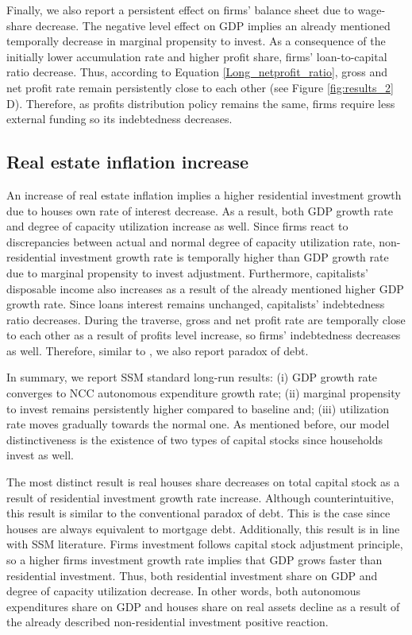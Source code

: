 \documentclass[12pt]{article}
\begin{document}
Finally, we also report a persistent effect on firms' balance sheet due to wage-share decrease.
The negative level effect on GDP implies an already mentioned temporally decrease in marginal propensity to invest.
As a consequence of the initially lower accumulation rate and higher profit share, firms' loan-to-capital ratio decrease.
Thus, according to Equation \ref{Long_netprofit_ratio}, gross and net profit rate remain persistently close to each other (see Figure \ref{fig:results_2} D).
Therefore, as profits distribution policy remains the same, firms require less external funding so its indebtedness decreases.


\subsection{Real estate inflation increase}
\label{sec:org42569ce}
\label{sec:Exp2}


An increase of real estate inflation implies a higher residential investment growth due to houses own rate of interest decrease.
As a result, both GDP growth rate and degree of capacity utilization increase as well.
Since firms react to discrepancies between actual and normal degree of capacity utilization rate, non-residential investment growth rate 
is temporally higher than GDP growth rate due to marginal propensity to invest adjustment.
Furthermore, capitalists' disposable income also increases as a result of the already mentioned higher GDP growth rate.
Since loans interest remains unchanged, capitalists' indebtedness ratio decreases.
During the traverse, gross and net profit rate are temporally close to each other as a result of profits level increase, so firms' indebtedness decreases as well.
Therefore, similar to \textcite{mandarino-2020-worker-debt}, we also report paradox of debt.

In summary, we report SSM standard long-run results:
    (i) GDP growth rate converges to NCC autonomous expenditure growth rate;
    (ii) marginal propensity to invest remains persistently higher compared to baseline and;
    (iii) utilization rate moves gradually towards the normal one.
As mentioned before, our model distinctiveness is the existence of two types of capital stocks since households invest as well.


The most distinct result is real houses share decreases on total capital stock as a result of residential investment growth rate increase.
Although counterintuitive, this result is similar to the conventional paradox of debt.
This is the case since houses are always equivalent to  mortgage debt.
Additionally, this result is in line with SSM literature.
Firms investment follows capital stock adjustment principle, so a higher firms investment growth rate implies that
GDP grows faster than residential investment.
Thus, both residential investment share on GDP and degree of capacity  utilization decrease.
In other words, both autonomous expenditures share on GDP and houses share on real assets decline as a result of the already described non-residential investment positive reaction.
\end{document}
